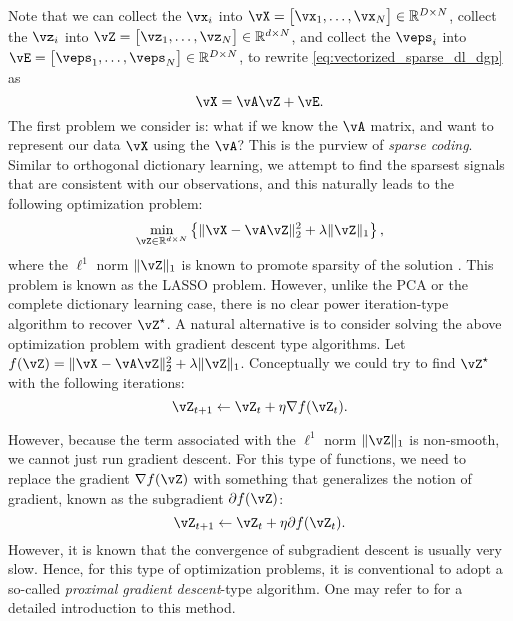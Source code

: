 \documentclass[../../book-main.tex]{subfiles}
\begin{document}
Note that we can collect the \(\vx_{i}\) into \(\vX = \mat{\vx_{1}, \dots, \vx_{N}} \in \R^{D \times N}\), collect the \(\vz_{i}\) into \(\vZ = \mat{\vz_{1}, \dots, \vz_{N}} \in \R^{d  \times N}\), and collect the \(\veps_{i}\) into \(\vE = \mat{\veps_{1}, \dots, \veps_{N}} \in \R^{D \times N}\), to rewrite \eqref{eq:vectorized_sparse_dl_dgp} as 
\begin{equation}\label{eq:sparse_dl_dgp}
    \vX = \vA\vZ + \vE.
\end{equation}
The first problem we consider is: what if we know the \(\vA\) matrix, and want to represent our data \(\vX\) using the \(\vA\)? This is the purview of \textit{sparse coding}. Similar to orthogonal dictionary learning, we attempt to find the sparsest signals that are consistent with our observations, and this naturally leads to the following optimization problem:
\begin{equation}\label{eq:sparse_dl_lasso}
    \min_{\vZ \in \R^{d \times N}}\bc{\norm{\vX - \vA\vZ}_{2}^{2} + \lambda \norm{\vZ}_{1}},
\end{equation}
where the \(\ell^1\) norm \(\norm{\vZ}_{1}\) is known to promote sparsity of the solution \cite{Wright-Ma-2022}. 
This problem is known as the LASSO problem. However, unlike the PCA or the
complete dictionary learning case, there is no clear power iteration-type
algorithm to recover \(\vZ^{\star}\). A natural alternative is to consider
solving the above optimization problem with gradient descent type algorithms.
Let \(f(\vZ) = \norm{\vX - \vA\vZ}_{2}^{2} + \lambda \norm{\vZ}_{1}\).
Conceptually we could try to find \(\vZ^{\star}\) with the following iterations:
\begin{equation}
    \vZ_{t+1} \leftarrow \vZ_t + \eta \nabla f(\vZ_t).
\end{equation}

However, because the term associated with the \(\ell^1\) norm \(\norm{\vZ}_{1}\) is non-smooth, we cannot just run gradient descent. For this type of functions, we need to replace the gradient \(\nabla f(\vZ)\) with something that generalizes the notion of gradient, known as the subgradient \(\partial f(\vZ)\):
\begin{equation}
    \vZ_{t+1} \leftarrow \vZ_t + \eta \partial f(\vZ_t).
\end{equation}
However, it is known that the convergence of subgradient descent is usually very slow. Hence, for this type of optimization problems, it is conventional to adopt a so-called {\em proximal gradient descent}-type algorithm. One may refer to \cite{Wright-Ma-2022} for a detailed introduction to this method. 
\end{document}
